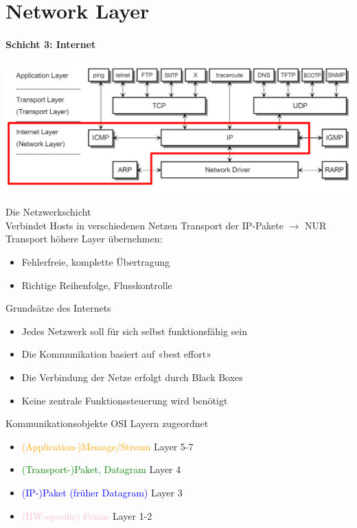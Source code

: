 \section{Network Layer}
\paragraph{Schicht 3: Internet}

\includegraphics[width=1\linewidth]{images/orientierung_network_layer.png}

\begin{definition}{Die Netzwerkschicht}\\
    Verbindet Hosts in verschiedenen Netzen
    Transport der IP-Pakete $\rightarrow$ NUR Transport höhere Layer übernehmen:
        \begin{itemize}
            \item Fehlerfreie, komplette Übertragung
            \item Richtige Reihenfolge, Flusskontrolle
        \end{itemize}
\end{definition}

\begin{lemma}{Grundsätze des Internets}
    \begin{itemize}
        \item Jedes Netzwerk soll für sich selbst funktionsfähig sein
        \item Die Kommunikation basiert auf «best effort»
        \item Die Verbindung der Netze erfolgt durch Black Boxes
        \item Keine zentrale Funktionssteuerung wird benötigt
    \end{itemize}
\end{lemma}

\begin{definition}{Kommunikationsobjekte} OSI Layern zugeordnet
       \begin{itemize}
        \item \textcolor{orange}{(Application-)Message/Stream} Layer 5-7
        \item \textcolor{green}{(Transport-)Paket, Datagram} Layer 4
        \item \textcolor{blue}{(IP-)Paket (früher Datagram)} Layer 3
        \item \textcolor{pink}{(HW-specific) Frame} Layer 1-2
    \end{itemize}
\end{definition}



